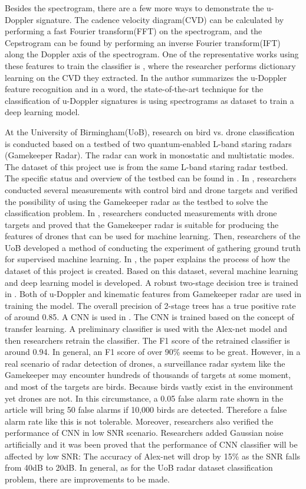 \documentclass{cta-author}
\begin{document}
Besides the spectrogram, there are a few more ways to demonstrate the u-Doppler signature. The cadence velocity diagram(CVD) can be calculated by performing a fast Fourier transform(FFT) on the spectrogram, and the Cepstrogram\cite{9} can be found by performing an inverse Fourier transform(IFT) along the Doppler axis of the spectrogram. One of the representative works using these features to train the classifier is \cite{10}, where the researcher performs dictionary learning on the CVD they extracted. In \cite{11} the author summarizes the u-Doppler feature recognition and in a word, the state-of-the-art technique for the classification of u-Doppler signatures is using spectrograms as dataset to train a deep learning model.

At the University of Birmingham(UoB), research on bird vs. drone classification is conducted based on a testbed of two quantum-enabled L-band staring radars (Gamekeeper Radar). The radar can work in monostatic and multistatic modes. The dataset of this project use is from the same L-band staring radar testbed. The specific status and overview of the testbed can be found in \cite{12}. In \cite{13}, researchers conducted several measurements with control bird and drone targets and verified the possibility of using the Gamekeeper radar as the testbed to solve the classification problem. In \cite{14}, researchers conducted measurements with drone targets and proved that the Gamekeeper radar is suitable for producing the features of drones that can be used for machine learning. Then, researchers of the UoB developed a method of conducting the experiment of gathering ground truth for supervised machine learning. In \cite{15}, the paper explains the process of how the dataset of this project is created. Based on this dataset, several machine learning and deep learning model is developed. 
A robust two-stage decision tree is trained in \cite{16}. Both of u-Doppler and kinematic features from Gamekeeper radar are used in training the model. The overall precision of 2-stage trees has a true positive rate of around 0.85. 
A CNN is used in \cite{17}. The CNN is trained based on the concept of transfer learning. A preliminary classifier is used with the Alex-net model and then researchers retrain the classifier. The F1 score of the retrained classifier is around 0.94.
In general, an F1 score of over 90\% seems to be great. However, in a real scenario of radar detection of drones, a surveillance radar system like the Gamekeeper may encounter hundreds of thousands of targets at some moment, and most of the targets are birds. Because birds vastly exist in the environment yet drones are not. In this circumstance, a 0.05 false alarm rate shown in the article\cite{17} will bring 50 false alarms if 10,000 birds are detected. Therefore a false alarm rate like this is not tolerable. 
Moreover, researchers also verified the performance of CNN in low SNR scenario\cite{18}\cite{19}. Researchers added Gaussian noise artificially and it was been proved that the performance of CNN classifier will be affected by low SNR: The accuracy of Alex-net will drop by 15\% as the SNR falls from 40dB to 20dB. In general, as for the UoB radar dataset classification problem, there are improvements to be made.
\end{document}

